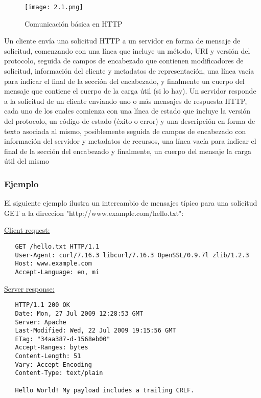 \begin{center}
   \begin{figure}   
      \begin{center}
         \texttt{[image: 2.1.png]}
      \end{center}
      \caption{Comunicación básica en HTTP}
   \end{figure}
\end{center}

Un cliente envía una solicitud HTTP a un servidor en forma de mensaje
 de solicitud, comenzando con una línea que incluye un método, URI y 
 versión del protocolo, seguida de campos de encabezado que contienen
  modificadores de solicitud, información del cliente y metadatos de
   representación, una línea vacía para indicar el final de la sección
    del encabezado, y finalmente un cuerpo del mensaje que contiene el 
    cuerpo de la carga útil (si lo hay). Un servidor responde a la 
    solicitud de un cliente enviando uno o más mensajes de respuesta 
    HTTP, cada uno de los cuales comienza con una línea de estado que 
    incluye la versión del protocolo, un código de estado (éxito o error)
     y una descripción en forma de texto asociada al mismo, posiblemente 
     seguida de campos de encabezado con información del servidor y
      metadatos de recursos, una línea vacía para indicar el final 
      de la sección del encabezado y finalmente, un cuerpo del mensaje
       la carga útil del mismo

\subsubsection*{Ejemplo}
El siguiente ejemplo ilustra un intercambio de mensajes típico 
para una solicitud GET a la direccion "http://www.example.com/hello.txt":

\bigskip
\noindent
\underline{Client request:}
\begin{verbatim}
   GET /hello.txt HTTP/1.1
   User-Agent: curl/7.16.3 libcurl/7.16.3 OpenSSL/0.9.7l zlib/1.2.3
   Host: www.example.com
   Accept-Language: en, mi
  \end{verbatim}
\underline{Server response:}
\begin{verbatim}
   HTTP/1.1 200 OK
   Date: Mon, 27 Jul 2009 12:28:53 GMT
   Server: Apache
   Last-Modified: Wed, 22 Jul 2009 19:15:56 GMT
   ETag: "34aa387-d-1568eb00"
   Accept-Ranges: bytes
   Content-Length: 51
   Vary: Accept-Encoding
   Content-Type: text/plain

   Hello World! My payload includes a trailing CRLF.
\end{verbatim}


